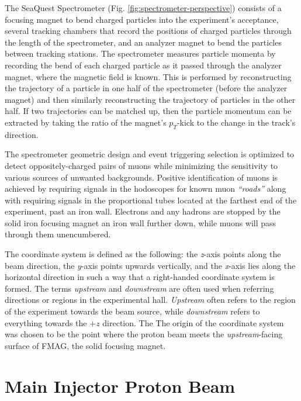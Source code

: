 The SeaQuest Spectrometer (Fig. \ref{fig:spectrometer-perspective}) consists of a focusing magnet to bend charged particles into the experiment's acceptance,
several tracking chambers that record the positions of charged particles through the length of the spectrometer, and
an analyzer magnet to bend the particles between tracking stations. The spectrometer measures particle momenta by
recording the bend of each charged particle as it passed through the analyzer magnet, where the magnetic field is known.
This is performed by reconstructing the trajectory of a particle in one half of the spectrometer (before the
analyzer magnet) and then similarly reconstructing the trajectory of particles in the other half. If two 
trajectories can be matched up, then the particle momentum can be extracted by taking the ratio of the 
magnet's $p_T$-kick to the change in the track's direction.

The spectrometer geometric design and event
triggering selection is optimized to detect oppositely-charged pairs of muons while minimizing the sensitivity
to various sources of unwanted backgrounds. Positive identification of muons is achieved by requiring signals
in the hodoscopes for known muon \emph{``roads''} along with requiring signals in the proportional tubes located at
the farthest end of the experiment, past an iron wall. Electrons and any hadrons are stopped by the solid iron
focusing magnet an iron wall further down, while muons will pass through them unencumbered.

The coordinate system is defined as the following: the \emph{z}-axis points along the beam direction, the
\emph{y}-axis points upwards vertically, and the \emph{x}-axis lies along the horizontal direction
in such a way that a right-handed coordinate system is formed. The terms \emph{upstream} and 
\emph{downstream} are often used when referring directions or regions in the experimental hall.
\emph{Upstream} often refers to the region of the experiment towards the beam source, while
\emph{downstream} refers to everything towards the $+z$ direction. 
The The origin of the coordinate system was chosen to be the point where the proton beam meets 
the \emph{upstream}-facing surface of FMAG, the solid focusing magnet.


\section{Main Injector Proton Beam}


